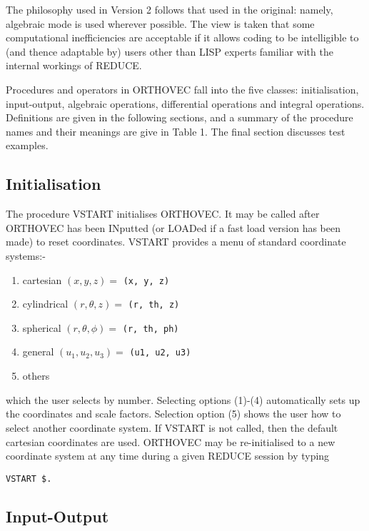 The philosophy used in Version 2 follows that used in the original:
namely, algebraic mode is used wherever possible.  The view is taken
that some computational inefficiencies are acceptable if it allows
coding to be intelligible to (and thence adaptable by) users other
than LISP experts familiar with the internal workings of REDUCE.

Procedures and operators in ORTHOVEC fall into the five classes: 
initialisation, input-output, algebraic operations, differential
operations and integral operations.  Definitions are given in 
the following sections, and
a summary of the procedure names and their meanings are give in Table 1.
The final section discusses test examples.

\subsection{Initialisation}\label{vstart}
The procedure VSTART initialises ORTHOVEC.  It may be
called after ORTHOVEC has been INputted (or LOADed if a fast load
version has been made) to reset coordinates.  VSTART provides a
menu of standard coordinate systems:-


\begin{enumerate}
\item cartesian $(x, y, z) = $ {\tt (x, y, z)}
\item cylindrical $(r, \theta, z) = $ {\tt (r, th, z)}
\item spherical $(r, \theta, \phi) = $ {\tt (r, th, ph) }
\item general $( u_1, u_2, u_3 ) = $ {\tt (u1, u2, u3) }
\item others
\end{enumerate}

which the user selects by number.  Selecting options (1)-(4)
automatically sets up the coordinates and scale factors.  Selection
option (5) shows the user how to select another coordinate system.  If
VSTART is not called, then the default cartesian coordinates are used.
ORTHOVEC may be re-initialised to a new coordinate system at any time
during a given REDUCE session by typing
\begin{verbatim}
VSTART $.
\end{verbatim}

\subsection{Input-Output}

